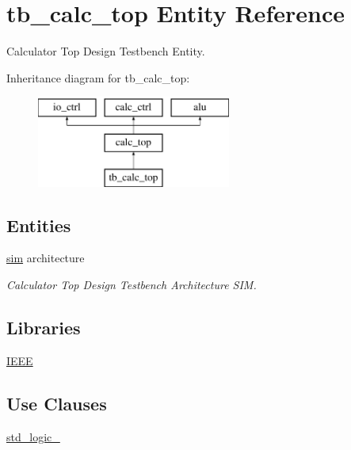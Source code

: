\hypertarget{classtb__calc__top}{}\section{tb\+\_\+calc\+\_\+top Entity Reference}
\label{classtb__calc__top}


Calculator Top Design Testbench Entity.  


Inheritance diagram for tb\+\_\+calc\+\_\+top\+:\begin{figure}[H]
\begin{center}
\leavevmode
\includegraphics[height=3.000000cm]{classtb__calc__top}
\end{center}
\end{figure}
\subsection*{Entities}
\begin{DoxyCompactItemize}
\item 
\hyperlink{classtb__calc__top_1_1sim}{sim} architecture
\begin{DoxyCompactList}\small\item\em Calculator Top Design Testbench Architecture S\+IM. \end{DoxyCompactList}\end{DoxyCompactItemize}
\subsection*{Libraries}
 \begin{DoxyCompactItemize}
\item 
\hyperlink{classtb__calc__top_ae4f03c286607f3181e16b9aa12d0c6d4}{I\+E\+EE} 
\end{DoxyCompactItemize}
\subsection*{Use Clauses}
 \begin{DoxyCompactItemize}
\item 
\hyperlink{classtb__calc__top_acd03516902501cd1c7296a98e22c6fcb}{std\+\_\+logic\+\_}   
\end{DoxyCompactItemize}


